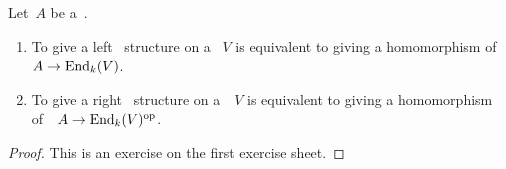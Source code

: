 \begin{proposition}
  \label{modules as homomorphisms into endomorphisms}
  Let~$A$ be a~{\kalg}.
  \begin{enumerate}
    \item
      To give a left~{} structure on a~{\module{$\kf$}} $V$ is equivalent to giving a homomorphism of~{\kalg}~$A \to \operatorname{End}_k(V)$.
    \item
      To give a right~{} structure on a~{\module{$\kf$}}~$V$ is equivalent to giving a homomorphism of~{\kalg}~$A \to \operatorname{End}_k(V)^{\mathrm{op}}$.
  \end{enumerate}
\end{proposition}


\begin{proof}
  This is an exercise on the first exercise sheet.
\end{proof}




